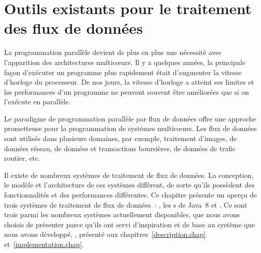 
\chapter{Outils existants pour le traitement des flux de donn\'ees}
\label{outils_connus}
\label{outils_connus.chap}










La programmation parall\`ele devient de plus en plus une n\'ecessit\'e avec l'apparition des architectures multicœurs. Il y a quelques ann\'ees, la principale fa\c{c}on d'ex\'ecuter un programme plus rapidement \'etait d'augmenter la vitesse d'horloge du processeur. De nos jours, la vitesse d'horloge a atteint ses limites et les performances d'un programme ne peuvent souvent \^etre am\'elior\'ees que si on l'ex\'ecute en parall\`ele. 

Le paradigme de programmation parall\`ele par flux de donn\'ees offre une approche prometteuse pour la programmation de syst\`emes multicœurs. Les flux de donn\'ees sont utilis\'es dans plusieurs domaines, par exemple, traitement d'images, de donn\'ees r\'eseau, de donn\'ees et transactions boursi\`eres, de donn\'ees de trafic routier, etc.



Il existe de nombreux syst\`emes de traitement de flux de donn\'ees. La conception, le mod\`ele et l'architecture de ces syst\`emes diff\`erent, de sorte qu'ils poss\`edent des fonctionnalit\'es et des performances diff\'erentes. Ce chapitre pr\'esente un aper\c{c}u de trois syst\`emes de traitement de flux de donn\'ees~: , les s de Java~8 et .  Ce sont trois parmi les nombreux syst\`emes actuellement disponibles, que nous avons choisis de pr\'esenter parce qu'ils ont servi d'inspiration et de base au syst\`eme que nous avons d\'evelopp\'e, \ppff, pr\'esent\'e aux chapitres~\ref{description.chap} et~\ref{implementation.chap}.


